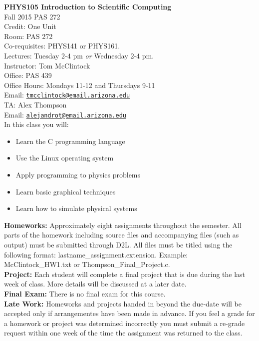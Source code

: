 \documentclass{article}
\begin{document}
\LARGE\textbf{PHYS105 Introduction to Scientific Computing}\\
\normalsize Fall 2015 PAS 272\\

Credit: One Unit\\
Room: PAS 272\\
Co-requisites: PHYS141 or PHYS161.\\
Lectures: Tuesday 2-4 pm {\it or} Wednesday 2-4 pm.\\
Instructor: Tom McClintock\\
Office: PAS 439\\
Office Hours: Mondays 11-12 and Thursdays 9-11\\
Email: \href{mailto:tmcclintock@email.arizona.edu}{\nolinkurl{tmcclintock@email.arizona.edu}}\\
TA: Alex Thompson\\
Email: \href{mailto:alejandrot@email.arizona.edu}{\nolinkurl{alejandrot@email.arizona.edu}}\\

In this class you will:
\begin{itemize}
\item Learn the C programming language
\item Use the Linux operating system
\item Apply programming to physics problems
\item Learn basic graphical techniques
\item Learn how to simulate physical systems
\end{itemize}

\textbf{Homeworks:} Approximately eight assignments throughout the semester. 
All parts of the homework including source files and accompanying files 
(such as output) must be submitted through D2L. 
All files must be titled using the following format:
lastname\_assignment.extension. Example: McClintock\_HW1.txt or 
Thompson\_Final\_Project.c.\\

\textbf{Project:} Each student will complete a final project that 
is due during the last week of class. More details will be discussed 
at a later date.\\

\textbf{Final Exam:} There is no final exam for this course.\\

\textbf{Late Work:} Homeworks and projects handed in beyond the due-date
will be accepted only if arrangementes have been made in advance. If
you feel a grade for a homework or project was determined incorrectly
you must submit a re-grade request within one week of the time the
assignment was returned to the class.\\
\end{document}
